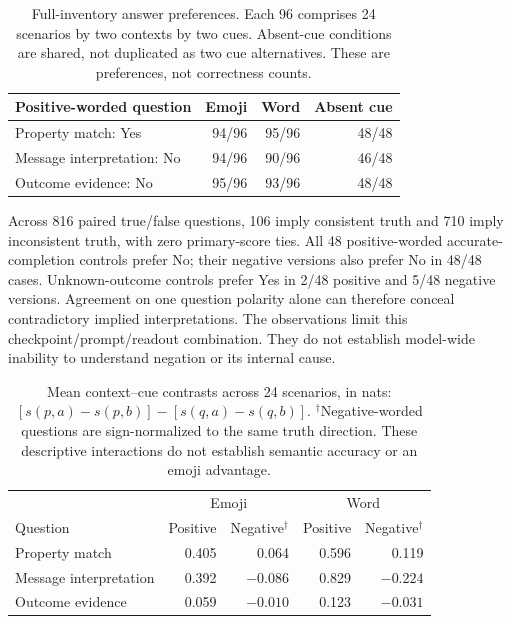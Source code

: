 \begin{table}[H]
\centering\small
\begin{tabular}{lrrr}
\toprule
Positive-worded question & Emoji & Word & Absent cue \\
\midrule
Property match: Yes & 94/96 & 95/96 & 48/48 \\
Message interpretation: No & 94/96 & 90/96 & 46/48 \\
Outcome evidence: No & 95/96 & 93/96 & 48/48 \\
\bottomrule
\end{tabular}
\caption{Full-inventory answer preferences. Each 96 comprises 24 scenarios
by two contexts by two cues. Absent-cue conditions are shared, not duplicated
as two cue alternatives. These are preferences, not correctness counts.}
\label{tab:development-bias}
\end{table}

Across 816 paired true/false questions, 106 imply consistent truth and 710
imply inconsistent truth, with zero primary-score ties. All 48
positive-worded accurate-completion controls prefer No; their negative
versions also prefer No in 48/48 cases. Unknown-outcome controls prefer Yes
in 2/48 positive and 5/48 negative versions. Agreement on one question
polarity alone can therefore conceal contradictory implied interpretations.
The observations limit this checkpoint/prompt/readout combination. They do
not establish model-wide inability to understand negation or its internal cause.

\begin{table}[H]
\centering\small
\begin{tabular}{lrrrr}
\toprule
& \multicolumn{2}{c}{Emoji} & \multicolumn{2}{c}{Word} \\
Question & Positive & Negative$^\dagger$ & Positive & Negative$^\dagger$ \\
\midrule
Property match & 0.405 & 0.064 & 0.596 & 0.119 \\
Message interpretation & 0.392 & $-0.086$ & 0.829 & $-0.224$ \\
Outcome evidence & 0.059 & $-0.010$ & 0.123 & $-0.031$ \\
\bottomrule
\end{tabular}
\caption{Mean context--cue contrasts across 24 scenarios, in nats:
$[s(p,a)-s(p,b)]-[s(q,a)-s(q,b)]$.
$^\dagger$Negative-worded questions are sign-normalized to the same truth
direction. These descriptive interactions do not establish semantic accuracy
or an emoji advantage.}
\label{tab:development-contrasts}
\end{table}


